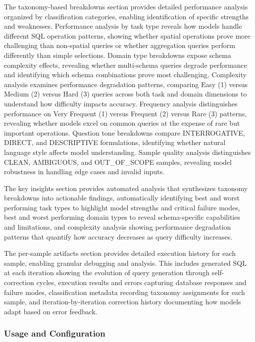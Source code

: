 The taxonomy-based breakdowns section provides detailed performance analysis organized by classification categories, enabling identification of specific strengths and weaknesses. Performance analysis by task type reveals how models handle different SQL operation patterns, showing whether spatial operations prove more challenging than non-spatial queries or whether aggregation queries perform differently than simple selections. Domain type breakdowns expose schema complexity effects, revealing whether multi-schema queries degrade performance and identifying which schema combinations prove most challenging. Complexity analysis examines performance degradation patterns, comparing Easy (1) versus Medium (2) versus Hard (3) queries across both task and domain dimensions to understand how difficulty impacts accuracy. Frequency analysis distinguishes performance on Very Frequent (1) versus Frequent (2) versus Rare (3) patterns, revealing whether models excel on common queries at the expense of rare but important operations. Question tone breakdowns compare INTERROGATIVE, DIRECT, and DESCRIPTIVE formulations, identifying whether natural language style affects model understanding. Sample quality analysis distinguishes CLEAN, AMBIGUOUS, and OUT\_OF\_SCOPE samples, revealing model robustness in handling edge cases and invalid inputs.

The key insights section provides automated analysis that synthesizes taxonomy breakdowns into actionable findings, automatically identifying best and worst performing task types to highlight model strengths and critical failure modes, best and worst performing domain types to reveal schema-specific capabilities and limitations, and complexity analysis showing performance degradation patterns that quantify how accuracy decreases as query difficulty increases.

The per-sample artifacts section provides detailed execution history for each sample, enabling granular debugging and analysis. This includes generated SQL at each iteration showing the evolution of query generation through self-correction cycles, execution results and errors capturing database responses and failure modes, classification metadata recording taxonomy assignments for each sample, and iteration-by-iteration correction history documenting how models adapt based on error feedback.

\subsubsection{Usage and Configuration}

